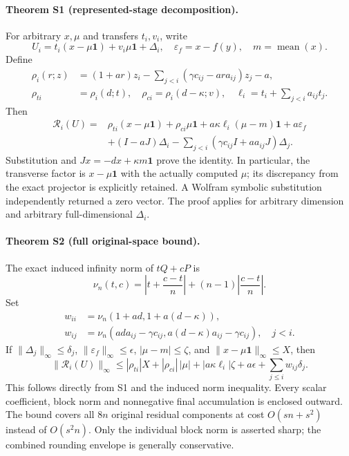 \paragraph{Theorem S1 (represented-stage decomposition).}
For arbitrary $x,\mu$ and transfers $t_i,v_i$, write
\begin{equation}
 U_i=t_i(x-\mu\mathbf1)+v_i\mu\mathbf1+\Delta_i,
 \quad \varepsilon_f=x-f(y),\quad m=\operatorname{mean}(x).
\end{equation}
Define
\begin{align}
 \rho_i(r;z)&=(1+ar)z_i
 -\sum_{j<i}(\gamma c_{ij}-ar a_{ij})z_j-a,\\
 \rho_{ti}&=\rho_i(d;t),\quad
 \rho_{ci}=\rho_i(d-\kappa;v),\quad
 \ell_i=t_i+\sum_{j<i}a_{ij}t_j.
\end{align}
Then
\begin{align}
 \mathcal R_i(U)={}&\rho_{ti}(x-\mu\mathbf1)
 +\rho_{ci}\mu\mathbf1
 +a\kappa\ell_i(\mu-m)\mathbf1+a\varepsilon_f \nonumber\\
 &+(I-aJ)\Delta_i
 -\sum_{j<i}(\gamma c_{ij}I+a a_{ij}J)\Delta_j.
\end{align}
Substitution and $Jx=-dx+\kappa m\mathbf1$ prove the identity. In particular, the transverse factor is $x-\mu\mathbf1$ with the actually computed $\mu$; its discrepancy from the exact projector is explicitly retained. A Wolfram symbolic substitution independently returned a zero vector. The proof applies for arbitrary dimension and arbitrary full-dimensional $\Delta_i$.

\paragraph{Theorem S2 (full original-space bound).}
The exact induced infinity norm of $tQ+cP$ is
\begin{equation}
 \nu_n(t,c)=\left|t+\frac{c-t}{n}\right|
 +(n-1)\left|\frac{c-t}{n}\right|.
\end{equation}
Set
\begin{align}
 w_{ii}&=\nu_n(1+ad,1+a(d-\kappa)),\\
 w_{ij}&=\nu_n(ad a_{ij}-\gamma c_{ij},
 a(d-\kappa)a_{ij}-\gamma c_{ij}),\quad j<i.
\end{align}
If $\|\Delta_j\|_\infty\le\delta_j$,
$\|\varepsilon_f\|_\infty\le\epsilon$,
$|\mu-m|\le\zeta$, and $\|x-\mu\mathbf1\|_\infty\le X$, then
\begin{equation}
 \|\mathcal R_i(U)\|_\infty\le
 |\rho_{ti}|X+|\rho_{ci}|\,|\mu|
 +|a\kappa\ell_i|\zeta+a\epsilon
 +\sum_{j\le i}w_{ij}\delta_j.
\end{equation}
This follows directly from S1 and the induced norm inequality. Every scalar coefficient, block norm and nonnegative final accumulation is enclosed outward. The bound covers all $8n$ original residual components at cost $O(sn+s^2)$ instead of $O(s^2n)$. Only the individual block norm is asserted sharp; the combined rounding envelope is generally conservative.

